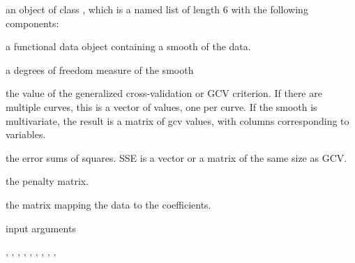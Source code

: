 \documentclass{article}
\begin{document}
\begin{Value}
an object of class , which is a named list of length 6
with the following components:

\begin{ldescription}
\item[\code{fd}] a functional data object containing a smooth of the data.

\item[\code{df}] a degrees of freedom measure of the smooth

\item[\code{gcv}] the value of the generalized cross-validation or GCV criterion.  If
there are multiple curves, this is a vector of values, one per
curve.  If the smooth is multivariate, the result is a matrix of gcv
values, with columns corresponding to variables.


\item[\code{SSE}] the error sums of squares.  SSE is a vector or a matrix of the same
size as GCV.

\item[\code{penmat}] the penalty matrix.

\item[\code{y2cMap}] the matrix mapping the data to the coefficients.

\item[\code{argvals, y}] input arguments
\end{ldescription}
\end{Value}
\begin{SeeAlso}\relax
{}, ,
, ,
, ,
, ,
, 
\end{SeeAlso}
\end{document}
